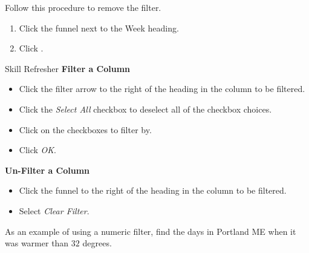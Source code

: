 Follow this procedure to remove the filter.

\begin{enumbox}
	\begin{enumerate}
		\item Click the funnel next to the Week heading.
		\item Click .
	\end{enumerate}
\end{enumbox}
	
\begin{center}
	\begin{sklbox}{Skill Refresher}
		\textbf{Filter a Column}
		\\
		\begin{itemize}
			\setlength{\itemsep}{0pt}
			\setlength{\parskip}{0pt}
			\setlength{\parsep}{0pt}

			\item Click the filter arrow to the right of the heading in the column to be filtered.
			\item Click the \textit{Select All} checkbox to deselect all of the checkbox choices.
			\item Click on the checkboxes to filter by.
			\item Click \textit{OK}.
			
		\end{itemize}
		
		\bigskip
		\textbf{Un-Filter a Column}
		
		\begin{itemize}
			\setlength{\itemsep}{0pt}
			\setlength{\parskip}{0pt}
			\setlength{\parsep}{0pt}
			
			\item Click the funnel to the right of the heading in the column to be filtered.
			\item Select \textit{Clear Filter}.
			
		\end{itemize}
	\end{sklbox}
\end{center}

As an example of using a numeric filter, find the days in Portland ME when it was warmer than $ 32 $ degrees.

